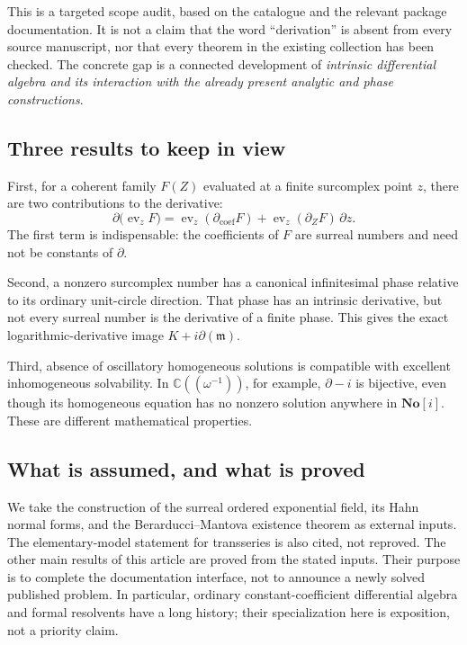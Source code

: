 \documentclass[11pt]{article}
\numberwithin{equation}{section}
\theoremstyle{definition}
\newcommand{\No}{\mathbf{No}}
\newcommand{\C}{\mathbb C}
\newcommand{\mm}{\mathfrak m}
\newcommand{\DD}{\partial}
\newcommand{\Dc}{\partial_{\mathrm{coef}}}
\newcommand{\Dz}{\partial_Z}
\newcommand{\ev}{\operatorname{ev}}
\begin{document}
This is a targeted scope audit, based on the catalogue and the relevant
package documentation. It is not a claim that the word ``derivation'' is
absent from every source manuscript, nor that every theorem in the existing
collection has been checked. The concrete gap is a connected development of
\emph{intrinsic differential algebra and its interaction with the already
present analytic and phase constructions}.

\subsection{Three results to keep in view}
First, for a coherent family $F(Z)$ evaluated at a finite surcomplex point
$z$, there are two contributions to the derivative:
\begin{equation}\label{eq:introchain}
 \DD\bigl(\ev_zF\bigr)
 =\ev_z(\Dc F)+\ev_z(\Dz F)\,\DD z.
\end{equation}
The first term is indispensable: the coefficients of $F$ are surreal
numbers and need not be constants of $\DD$.

Second, a nonzero surcomplex number has a canonical infinitesimal phase
relative to its ordinary unit-circle direction. That phase has an intrinsic
derivative, but not every surreal number is the derivative of a finite
phase. This gives the exact logarithmic-derivative image
$K+i\DD(\mm)$.

Third, absence of oscillatory homogeneous solutions is compatible with
excellent inhomogeneous solvability. In $\C((\omega^{-1}))$, for example,
$\DD-i$ is bijective, even though its homogeneous equation has no nonzero
solution anywhere in $\No[i]$. These are different mathematical properties.

\subsection{What is assumed, and what is proved}
We take the construction of the surreal ordered exponential field, its Hahn
normal forms, and the Berarducci--Mantova existence theorem as external
inputs. The elementary-model statement for transseries is also cited, not
reproved. The other main results of this article are proved from the stated
inputs. Their purpose is to complete the documentation interface, not to
announce a newly solved published problem. In particular, ordinary
constant-coefficient differential algebra and formal resolvents have a long
history; their specialization here is exposition, not a priority claim.
\end{document}
